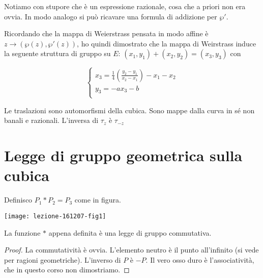 Notiamo con stupore che è un espressione razionale, cosa che a priori non era ovvia.
In modo analogo si può ricavare una formula di addizione per $\wp'$.

\begin{osservazione}
Ricordando che la mappa di Weierstrass pensata in modo affine è $z \rightarrow (\wp(z),\wp'(z))$, ho quindi dimostrato che la mappa di Weirstrass induce la seguente struttura di gruppo su $E$:
$(x_1,y_1) + (x_2,y_2) = (x_3,y_3)$ con

\begin{displaymath}
  \left\{
    \begin{array}{l}
      x_3 = \frac14\left(\frac{y_2-y_1}{x_2-x_1}\right) - x_1 - x_2 \\
      y_3 = - ax_3 - b \\
    \end{array}
  \right.
\end{displaymath}
\end{osservazione}

\begin{osservazione}
Le traslazioni sono automorfismi della cubica. Sono mappe dalla curva in sé non banali e razionali.
L'inversa di $\tau_z$ è $\tau_{-z}$
\end{osservazione}


\section{Legge di gruppo geometrica sulla cubica}
Definisco $P_1 * P_2 = P_3$ come in figura.
\begin{center}
  \texttt{[image: lezione-161207-fig1]}
\end{center}



\begin{proposizione}
La funzione $*$ appena definita è una legge di gruppo commutativa.
\end{proposizione}
\begin{proof}
La commutatività è ovvia.
L'elemento neutro è il punto all'infinito (si vede per ragioni geometriche).
L'inverso di $P$ è $-P$.
Il vero osso duro è l'associatività, che in questo corso non dimostriamo.
\end{proof}

